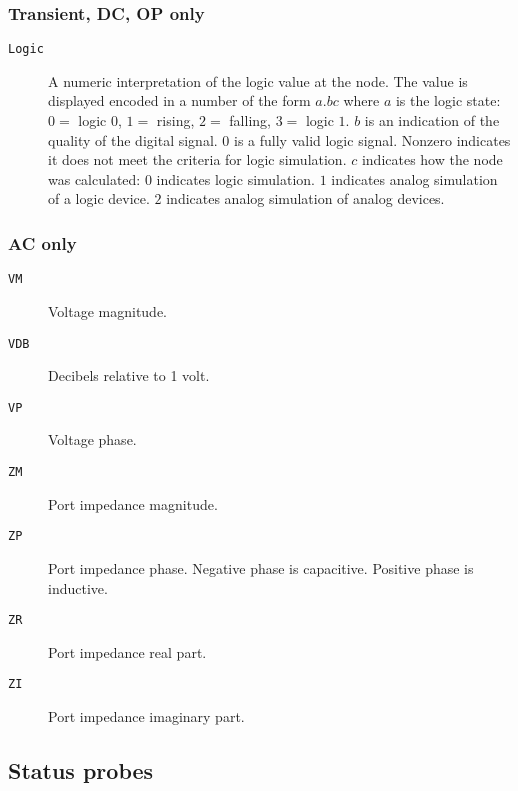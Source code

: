 \subsubsection{Transient, DC, OP only}
\begin{description}

\item[{\tt Logic}] A numeric interpretation of the logic value at the node.
The value is displayed encoded in a number of the form $a.bc$ where $a$ is
the logic state: $0 =$ logic $0$, $1 =$ rising, $2 =$ falling, $3 =$ logic
$1$.  $b$ is an indication of the quality of the digital signal.  $0$ is a
fully valid logic signal.  Nonzero indicates it does not meet the criteria
for logic simulation.  $c$ indicates how the node was calculated:  $0$
indicates logic simulation.  $1$ indicates analog simulation of a logic
device.  $2$ indicates analog simulation of analog devices.

\end{description}
\subsubsection{AC only}
\begin{description}

\item[{\tt VM}] Voltage magnitude.

\item[{\tt VDB}] Decibels relative to 1 volt.

\item[{\tt VP}] Voltage phase.

\item[{\tt ZM}] Port impedance magnitude.

\item[{\tt ZP}] Port impedance phase.  Negative phase is capacitive.  
Positive phase is inductive.

\item[{\tt ZR}] Port impedance real part.

\item[{\tt ZI}] Port impedance imaginary part.

\end{description}
\subsection{Status probes}

